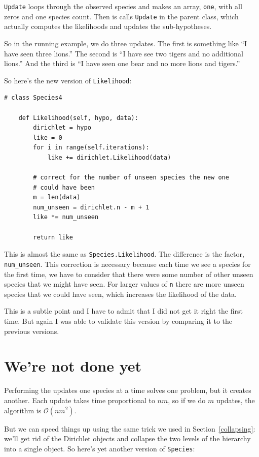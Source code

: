 \documentclass[12pt]{book}
\begin{document}
{\tt Update} loops through the observed species and makes an
array, {\tt one}, with all zeros and one species count.  Then
is calls {\tt Update} in the parent class, which actually computes
the likelihoods and updates the sub-hypotheses.

So in the running example, we do three updates.  The first
is something like ``I have seen three lions.''  The second is
``I have see two tigers and no additional lions.''  And the third
is ``I have seen one bear and no more lions and tigers.''

So here's the new version of {\tt Likelihood}:

\begin{verbatim}
# class Species4

    def Likelihood(self, hypo, data):
        dirichlet = hypo
        like = 0
        for i in range(self.iterations):
            like += dirichlet.Likelihood(data)

        # correct for the number of unseen species the new one
        # could have been
        m = len(data)
        num_unseen = dirichlet.n - m + 1
        like *= num_unseen

        return like
\end{verbatim}

This is almost the same as {\tt Species.Likelihood}.  The difference
is the factor, \verb"num_unseen".  This correction is necessary
because each time we see a species for the first time, we have to
consider that there were some number of other unseen species that
we might have seen.  For larger values of {\tt n} there are more
unseen species that we could have seen, which increases the likelihood
of the data.

This is a subtle point and I have to admit that I did not get it right
the first time.  But again I was able to validate this version
by comparing it to the previous versions.


\section{We're not done yet}

\newcommand{\BigO}[1]{\mathcal{O}(#1)}

Performing the updates one species at a time solves one problem, but
it creates another.  Each update takes time proportional to $n m$,
so if we do $m$ updates, the algorithm is $\BigO{n m^2}$. 

But we can speed things up using the same trick we used in
Section~\ref{collapsing}: we'll get rid of the Dirichlet objects and
collapse the two levels of the hierarchy into a single object.  So
here's yet another version of {\tt Species}:
\end{document}
